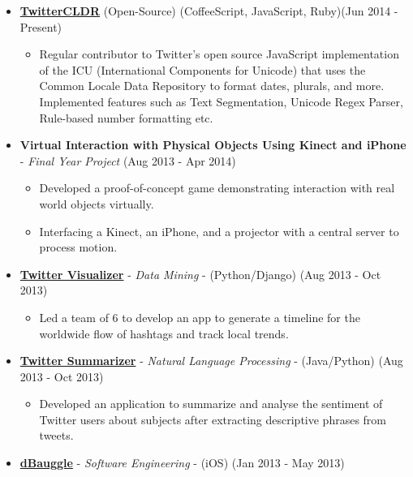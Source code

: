 \begin{itemize}
\tightlist
\item
  \href{https://github.com/twitter/twitter-cldr-js}{\textbf{TwitterCLDR}}
  (Open-Source) (CoffeeScript, JavaScript, Ruby)\hfill (Jun 2014 -
  Present)

  \begin{itemize}
  \tightlist
  \item
    Regular contributor to Twitter's open source JavaScript
    implementation of the ICU (International Components for Unicode)
    that uses the Common Locale Data Repository to format dates,
    plurals, and more. Implemented features such as Text Segmentation,
    Unicode Regex Parser, Rule-based number formatting etc.
  \end{itemize}
\item
  \textbf{Virtual Interaction with Physical Objects Using Kinect and
  iPhone} - \emph{Final Year Project} \hfill (Aug 2013 - Apr 2014)

  \begin{itemize}
  \tightlist
  \item
    Developed a proof-of-concept game demonstrating interaction with
    real world objects virtually.
  \item
    Interfacing a Kinect, an iPhone, and a projector with a central
    server to process motion.
  \end{itemize}
\item
  \href{https://github.com/radzinzki/Twitter-Visualiser}{\textbf{Twitter
  Visualizer}} - \emph{Data Mining} - (Python/Django) \hfill (Aug 2013 -
  Oct 2013)

  \begin{itemize}
  \tightlist
  \item
    Led a team of 6 to develop an app to generate a timeline for the
    worldwide flow of hashtags and track local trends.
  \end{itemize}
\item
  \href{https://github.com/radzinzki/NLP}{\textbf{Twitter Summarizer}} -
  \emph{Natural Language Processing} - (Java/Python) \hfill (Aug 2013 -
  Oct 2013)

  \begin{itemize}
  \tightlist
  \item
    Developed an application to summarize and analyse the sentiment of
    Twitter users about subjects after extracting descriptive phrases
    from tweets.
  \end{itemize}
\item
  \href{https://itunes.apple.com/us/app/dbauggle!/id625981185?mt=8}{\textbf{dBauggle}}
  - \emph{Software Engineering} - (iOS) \hfill (Jan 2013 - May 2013)


\end{itemize}
